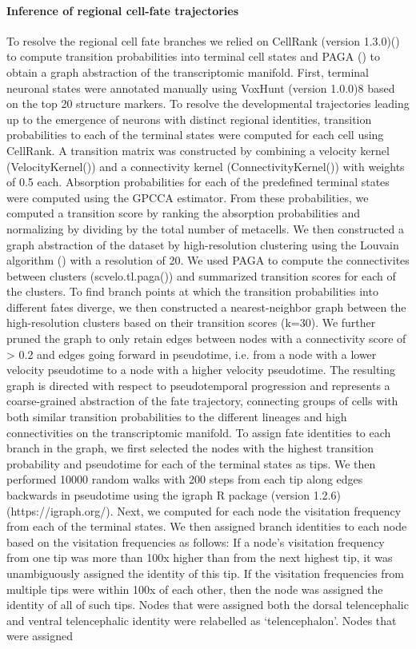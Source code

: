 \paragraph{Inference of regional cell-fate trajectories}
To resolve the regional cell fate branches we relied on CellRank (version 1.3.0)(\cite{lange_cellrank_2022}) to compute transition probabilities into terminal cell states and PAGA (\cite{wolf_scanpy_2018}) to obtain a graph abstraction of the transcriptomic manifold. First, terminal neuronal states were annotated manually using VoxHunt (version 1.0.0)8 based on the top 20 structure markers. To resolve the developmental trajectories leading up to the emergence of neurons with distinct regional identities, transition probabilities to each of the terminal states were computed for each cell using CellRank. A transition matrix was constructed by combining a velocity kernel (VelocityKernel()) and a connectivity kernel (ConnectivityKernel()) with weights of 0.5 each. Absorption probabilities for each of the predefined terminal states were computed using the GPCCA estimator. From these probabilities, we computed a transition score by ranking the absorption probabilities and normalizing by dividing by the total number of metacells. We then constructed a graph abstraction of the dataset by high-resolution clustering using the Louvain algorithm (\cite{blondel_fast_2008}) with a resolution of 20. We used PAGA to compute the connectivites between clusters (scvelo.tl.paga()) and summarized transition scores for each of the clusters. To find branch points at which the transition probabilities into different fates diverge, we then constructed a nearest-neighbor graph between the high-resolution clusters based on their transition scores (k=30). We further pruned the graph to only retain edges between nodes with a connectivity score of > 0.2 and edges going forward in pseudotime, i.e. from a node with a lower velocity pseudotime to a node with a higher velocity pseudotime. The resulting graph is directed with respect to pseudotemporal progression and represents a coarse-grained abstraction of the fate trajectory, connecting groups of cells with both similar transition probabilities to the different lineages and high connectivities on the transcriptomic manifold. To assign fate identities to each branch in the graph, we first selected the nodes with the highest transition probability and pseudotime for each of the terminal states as tips. We then performed 10000 random walks with 200 steps from each tip along edges backwards in pseudotime using the igraph R package (version 1.2.6) (https://igraph.org/). Next, we computed for each node the visitation frequency from each of the terminal states. We then assigned branch identities to each node based on the visitation frequencies as follows: If a node's visitation frequency from one tip was more than 100x higher than from the next highest tip, it was unambiguously assigned the identity of this tip. If the visitation frequencies from multiple tips were within 100x of each other, then the node was assigned the identity of all of such tips. Nodes that were assigned both the dorsal telencephalic and ventral telencephalic identity were relabelled as ‘telencephalon'. Nodes that were assigned 